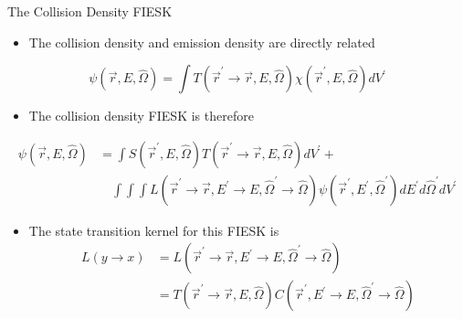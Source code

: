 \documentclass{beamer}
\begin{document}
\begin{frame}{The Collision Density FIESK}    

  \begin{itemize}
    \item The collision density and emission density are directly related
  \end{itemize}
  
  \begin{equation*}
    \psi(\vec{r},E,\hat{\Omega}) = \int 
    T(\vec{r}^{'} \to \vec{r},E,\hat{\Omega})
    \chi(\vec{r}^{'},E,\hat{\Omega})dV^{'}
  \end{equation*}

  \begin{itemize} 
    \item The collision density FIESK is therefore
  \end{itemize}
  \begin{align}
    \psi(\vec{r},E,\hat{\Omega}) & = \int S(\vec{r}^{'},E,\hat{\Omega})
    T(\vec{r}^{'} \to \vec{r},E,\hat{\Omega}) dV^{'} + \nonumber \\ 
    & \quad \int\int\int
    L(\vec{r}^{'} \to \vec{r},E^{'} \to E,\hat{\Omega}^{'} \to \hat{\Omega}) 
    \psi(\vec{r}^{'},E^{'},\hat{\Omega}^{'}) dE^{'}d\hat{\Omega}^{'}dV^{'}
    \nonumber
  \end{align}
  \begin{itemize}
    \item The state transition kernel for this FIESK is
      \begin{align}
        L(y \to x) & = 
        L(\vec{r}^{'} \to \vec{r},E^{'} \to E,\hat{\Omega}^{'} \to \hat{\Omega}) 
        \nonumber \\
        & = T(\vec{r}^{'} \to \vec{r},E,\hat{\Omega})
        C(\vec{r}^{'},E^{'} \to E,\hat{\Omega}^{'} \to \hat{\Omega}) \nonumber
      \end{align}
  \end{itemize}
  
\end{frame}
\end{document}
